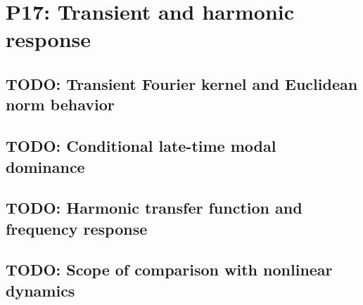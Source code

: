 
\section{P17: Transient and harmonic response}
\label{sec:P17}

\subsection{TODO: Transient Fourier kernel and Euclidean norm behavior}
\label{slot:P17-1}

\subsection{TODO: Conditional late-time modal dominance}
\label{slot:P17-2}

\subsection{TODO: Harmonic transfer function and frequency response}
\label{slot:P17-3}

\subsection{TODO: Scope of comparison with nonlinear dynamics}
\label{slot:P17-4}
